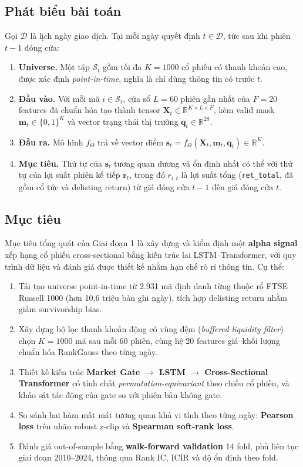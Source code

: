 \documentclass[a4paper,12pt]{article}
\begin{document}
\subsection{Phát biểu bài toán}
Gọi $\mathcal{D}$ là lịch ngày giao dịch. Tại mỗi ngày quyết định $t \in \mathcal{D}$, tức sau khi phiên $t-1$ đóng cửa:
\begin{enumerate}
    \item \textbf{Universe.} Một tập $\mathcal{S}_t$ gồm tối đa $K = 1000$ cổ phiếu có thanh khoản cao, được xác định \emph{point-in-time}, nghĩa là chỉ dùng thông tin có trước $t$.
    \item \textbf{Đầu vào.} Với mỗi mã $i \in \mathcal{S}_t$, cửa sổ $L = 60$ phiên gần nhất của $F = 20$ features đã chuẩn hóa tạo thành tensor $\mathbf{X}_t \in \mathbb{R}^{K \times L \times F}$, kèm valid mask $\mathbf{m}_t \in \{0,1\}^K$ và vector trạng thái thị trường $\mathbf{q}_t \in \mathbb{R}^{28}$.
    \item \textbf{Đầu ra.} Mô hình $f_\Theta$ trả về vector điểm $\mathbf{s}_t = f_\Theta(\mathbf{X}_t, \mathbf{m}_t, \mathbf{q}_t) \in \mathbb{R}^{K}$.
    \item \textbf{Mục tiêu.} Thứ tự của $\mathbf{s}_t$ tương quan dương và ổn định nhất có thể với thứ tự của lợi suất phiên kế tiếp $\mathbf{r}_t$, trong đó $r_{i,t}$ là lợi suất tổng (\texttt{ret\_total}, đã gồm cổ tức và delisting return) từ giá đóng cửa $t-1$ đến giá đóng cửa $t$.
\end{enumerate}

\subsection{Mục tiêu}
Mục tiêu tổng quát của Giai đoạn 1 là xây dựng và kiểm định một \textbf{alpha signal} xếp hạng cổ phiếu cross-sectional bằng kiến trúc lai LSTM--Transformer, với quy trình dữ liệu và đánh giá được thiết kế nhằm hạn chế rò rỉ thông tin. Cụ thể:
\begin{enumerate}
    \item Tái tạo universe point-in-time từ 2.931 mã định danh từng thuộc rổ FTSE Russell 1000 (hơn 10,6 triệu bản ghi ngày), tích hợp delisting return nhằm giảm survivorship bias.
    \item Xây dựng bộ lọc thanh khoản động có vùng đệm (\textit{buffered liquidity filter}) chọn $K = 1000$ mã sau mỗi 60 phiên, cùng hệ 20 features giá--khối lượng chuẩn hóa RankGauss theo từng ngày.
    \item Thiết kế kiến trúc \textbf{Market Gate $\to$ LSTM $\to$ Cross-Sectional Transformer} có tính chất \textit{permutation-equivariant} theo chiều cổ phiếu, và khảo sát tác động của gate so với phiên bản không gate.
    \item So sánh hai hàm mất mát tương quan khả vi tính theo từng ngày: \textbf{Pearson loss} trên nhãn robust z-clip và \textbf{Spearman soft-rank loss}.
    \item Đánh giá out-of-sample bằng \textbf{walk-forward validation} 14 fold, phủ liên tục giai đoạn 2010--2024, thông qua Rank IC, ICIR và độ ổn định theo fold.
\end{enumerate}
\end{document}
